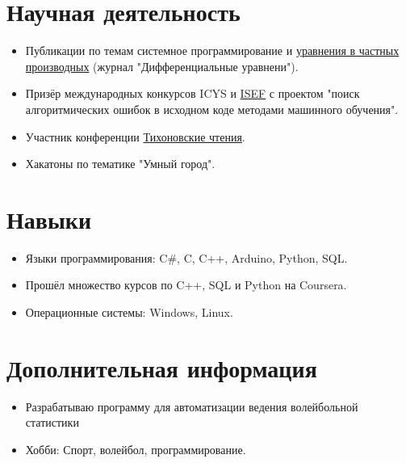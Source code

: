 \documentclass[a4paper,10pt]{article}
\begin{document}
	\section*{Научная деятельность}
	\begin{itemize}[left=0pt]
		\item Публикации по темам системное программирование и \href{https://journals.rcsi.science/0374-0641/issue/view/17906}{уравнения в частных производных} (журнал "Дифференциальные уравнени").
		\item Призёр международных конкурсов ICYS  и \href{https://partner.projectboard.world/isef/project/soft004---search-for-algorithmic-errors}{ISEF} с проектом "поиск алгоритмических ошибок в исходном коде методами машинного обучения".
		\item Участник конференции \href{https://cs.msu.ru/sites/cmc/files/attachs/tihonovskie_chteniya_el._versiya_0.pdf}{Тихоновские чтения}.
		\item Хакатоны по тематике "Умный город".
	\end{itemize}
	
	
	\section*{Навыки}
	\begin{itemize}[left=0pt]
		\item Языки программирования: C$\#$, C, C++, Arduino, Python, SQL.
		\item Прошёл множество курсов по C++, SQL и Python на Coursera.
		\item Операционные системы: Windows, Linux.
	\end{itemize}
	
	\section*{Дополнительная информация}
	\begin{itemize}[left=0pt]
		\item Разрабатываю программу для автоматизации ведения волейбольной статистики
		\item Хобби: Спорт, волейбол, программирование.
	\end{itemize}
	
\end{document}
